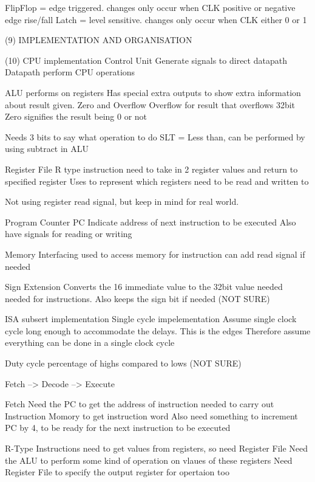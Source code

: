 \documentclass{article}
\begin{document}
		FlipFlop = edge triggered. changes only occur when CLK positive or negative edge rise/fall
		Latch = level sensitive. changes only occur when CLK either 0 or 1

	(9) IMPLEMENTATION AND ORGANISATION

	(10) CPU implementation
		Control Unit
			Generate signals to direct datapath
		Datapath
			perform CPU operations

		ALU performs on registers
			Has special extra outputs to show extra information about result given. Zero and Overflow
			Overflow for result that overflows 32bit
			Zero signifies the result being 0 or not

			Needs 3 bits to say what operation to do
			SLT = Less than, can be performed by using subtract in ALU


		Register File
			R type instruction need to take in 2 register values and return to specified register
			Uses to represent which registers need to be read and written to

			Not using register read signal, but keep in mind for real world.

		Program Counter PC
			Indicate address of next instruction to be executed
			Also have signals for reading or writing

		Memory Interfacing
			used to access memory for instruction
			can add read signal if needed

		Sign Extension
			Converts the 16 immediate value to the 32bit value needed needed for instructions. Also keeps the sign bit if needed (NOT SURE)

	ISA subsert implementation
		Single cycle impelementation
			Assume single clock cycle long enough to accommodate the delays. This is the edges
			Therefore assume everything can be done in a single clock cycle

			Duty cycle
				percentage of highs compared to lows (NOT SURE)

		Fetch --> Decode --> Execute

		Fetch
			Need the PC to get the address of instruction needed to carry out
			Instruction Momory to get instruction word
			Also need something to increment PC by 4, to be ready for the next instruction to be executed

		R-Type Instructions
			need to get values from registers, so need Register File
			Need the ALU to perform some kind of operation on vlaues of these registers 
			Need Register File to specify the output register for opertaion too
\end{document}
